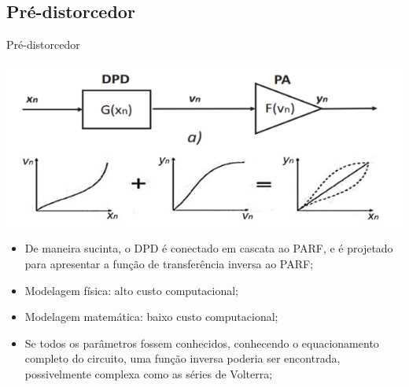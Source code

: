 \documentclass{if-beamer}
\begin{document}
\subsection{Pré-distorcedor}
\begin{frame}{Pré-distorcedor}
\begin{minipage}{0.5\textwidth}
		
		\includegraphics[scale=0.5]{DPDCascata.png}
		
	\end{minipage}%
	\hspace{0.04\textwidth}
	\begin{minipage}{0.5\textwidth}
		\begin{itemize}
			\item De maneira sucinta, o DPD é conectado em 
			cascata ao PARF, e é projetado para apresentar a 
			função de transferência inversa ao PARF;
			\item Modelagem física: alto custo computacional;
			\item Modelagem matemática: baixo custo computacional;
			\item Se todos os parâmetros fossem conhecidos, conhecendo o equacionamento completo do circuito, uma função inversa poderia ser encontrada, possivelmente complexa como as séries de Volterra;
		\end{itemize}
	\end{minipage}
\end{frame}
\end{document}
